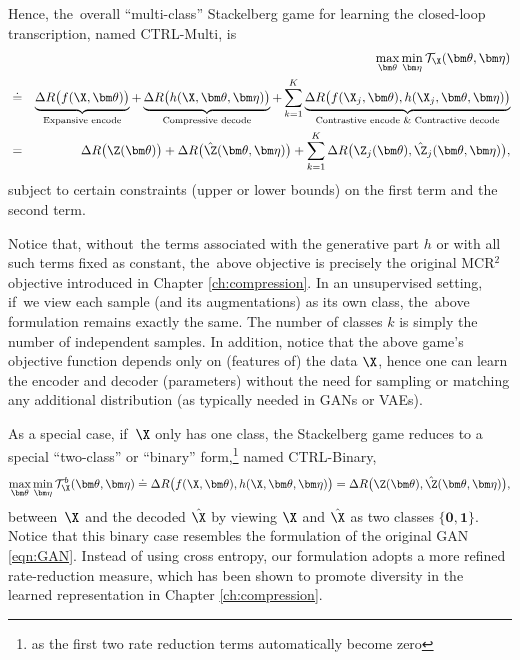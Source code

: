 \documentclass[../../book-main.tex]{subfiles}
\begin{document}
Hence, the~overall ``multi-class''  Stackelberg game for learning the closed-loop transcription, named CTRL-Multi, is
\begin{eqnarray}
&&\max_{\bm \theta} \min_{\bm \eta} \mathcal{T}_{\X}(\bm \theta, \bm \eta) \\
&\doteq& \underbrace{\Delta R\big(f(\X,\bm \theta)\big)}_{\text{Expansive encode}} + \underbrace{\Delta R\big(h(\X,\bm \theta, \bm \eta)\big)}_{\text{Compressive decode}} + \sum_{k=1}^K \underbrace{\Delta R\big(f(\X_j,\bm \theta), h(\X_j,\bm \theta,\bm \eta)\big)}_{\text{Contrastive encode \& Contractive decode}} \nonumber \\
&=& \Delta R\big(\Z(\bm \theta) \big) + \Delta R\big(\hat \Z(\bm \theta, \bm \eta)\big) + \sum_{k=1}^K \Delta R\big(\Z_j(
\bm \theta), \hat \Z_j(\bm \theta, \bm \eta) \big),
    \label{eq:MCR2-GAN-objective}
\end{eqnarray}
subject to certain constraints (upper or lower bounds) on the first term and the second term.  %



Notice that, without~the terms associated with the generative part $h$ or with all such terms fixed as constant, the~above objective is precisely the original MCR$^2$ objective introduced in Chapter \ref{ch:compression}. In an unsupervised setting, if~we view each sample (and its augmentations) as its own class, the~above formulation remains exactly the same. The number of classes $k$ is simply the number of independent samples. In addition, notice that the above game's objective function depends only on (features of) the data $\X$, hence one can learn the encoder and decoder (parameters) without the need for sampling or matching any additional distribution (as typically needed in GANs or VAEs).

As a special case, if~$\X$ only has one class, the Stackelberg game reduces to a special ``two-class'' or ``binary''  form,\footnote{as the first two rate reduction terms automatically become zero} named CTRL-Binary, 
\begin{equation}
 \max_{\bm \theta} \min_{\bm \eta} \mathcal{T}^b_{\X}(\bm \theta, \bm \eta) \doteq \Delta R\big(f(\X,\bm \theta), h(\X,\bm \theta,\bm \eta)\big) = \Delta R\big(\Z(\bm \theta), \hat \Z(\bm \theta, \bm \eta)\big), 
    \label{eq:MCR2-GAN-objective-binary}
\end{equation}
between~$\X$ and the decoded $\hat\X$ by viewing $\X$ and $\hat \X$ as two classes $\{\bm 0, \bm 1\}$. Notice that this binary case resembles the formulation of the original GAN \eqref{eqn:GAN}. Instead of using cross entropy, our formulation adopts a more refined rate-reduction measure, which has been shown to promote diversity in the learned representation in Chapter \ref{ch:compression}. %
\end{document}
